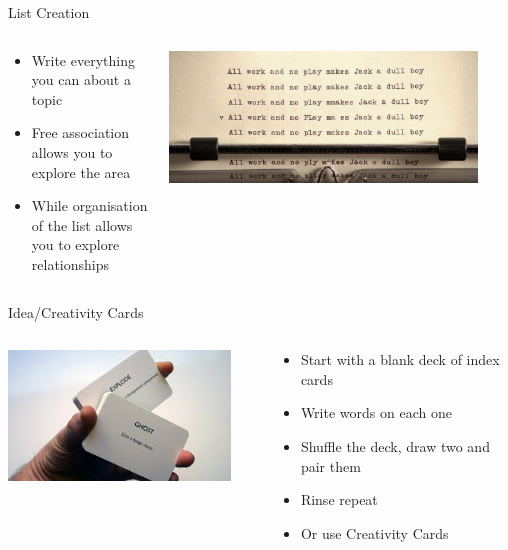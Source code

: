 \begin{frame}{List Creation}
	\begin{columns}
		\begin{column}{0.48\textwidth}
			\begin{itemize}
				\item Write everything you can about a topic
				\item Free association allows you to explore the area
				\item While organisation of the list allows you to explore relationships 
			\end{itemize}
		\end{column}
		\begin{column}{0.48\textwidth}
			\includegraphics[width=0.9\textwidth, height=0.7\textheight]{list_creation}
		\end{column}
	\end{columns}
\end{frame}

\begin{frame}{Idea/Creativity Cards}
	\begin{columns}
		\begin{column}{0.48\textwidth}
\includegraphics[width=0.9\textwidth, height=0.7\textheight]{creativity_cards}	
		\end{column}
		\begin{column}{0.48\textwidth}
			\begin{itemize}
				\item Start with a blank deck of index cards
				\item Write words on each one
				\item Shuffle the deck, draw two and pair them
				\item Rinse repeat
				\item Or use Creativity Cards
			\end{itemize}
		\end{column}
	\end{columns}
\end{frame}

